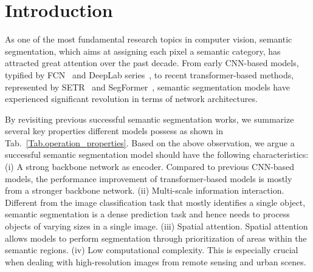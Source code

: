 \documentclass{article}
\newcommand{\tabref}[1]{Tab.~\ref{#1}}
\begin{document}
\section{Introduction}
\label{sec:intro}
As one of the most fundamental research topics in computer vision, 
semantic segmentation, 
which aims at assigning each pixel a semantic category, 
has attracted great attention over the past decade.
From early CNN-based models, typified by FCN~\cite{long2015fully} and
DeepLab series~\cite{chen2014semantic,chen2017rethinking,chen2018encoder},
to recent transformer-based methods, 
represented by SETR~\cite{zheng2021rethinking}
and SegFormer~\cite{xie2021segformer}, 
semantic segmentation models have experienced
significant revolution in terms of network architectures.



By revisiting previous successful semantic segmentation works, 
we summarize several key properties different models possess as shown in
\tabref{Tab.operation_properties}.
Based on the above observation, 
we argue a successful semantic segmentation model should have 
the following characteristics:
(i) A strong backbone network as encoder. 
Compared to previous CNN-based models, 
the performance improvement of transformer-based models is mostly 
from a stronger backbone network.
(ii) Multi-scale information interaction. 
Different from the image classification task that
mostly identifies a single object, 
semantic segmentation is a dense prediction task and hence
needs to process objects of varying sizes in a single image.
(iii) Spatial attention.
Spatial attention allows models to perform segmentation
through prioritization of areas within the semantic regions.
(iv) Low computational complexity. 
This is especially crucial when dealing with high-resolution
images from remote sensing and urban scenes.
\end{document}
